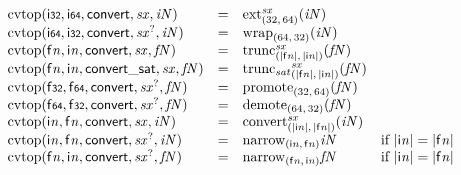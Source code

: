 $$
\begin{array}{@{}lcl@{}l@{}}
{\mathrm{cvtop}}(\mathsf{i{\scriptstyle32}}, \mathsf{i{\scriptstyle64}}, \mathsf{convert}, {\mathit{sx}}, {\mathit{iN}}) &=& {{{{\mathrm{ext}}}_{(32,\, 64)}^{{\mathit{sx}}}}}{({\mathit{iN}})} &  \\
{\mathrm{cvtop}}(\mathsf{i{\scriptstyle64}}, \mathsf{i{\scriptstyle32}}, \mathsf{convert}, {{\mathit{sx}}^?}, {\mathit{iN}}) &=& {{{\mathrm{wrap}}}_{(64,\, 32)}}{({\mathit{iN}})} &  \\
{\mathrm{cvtop}}({\mathsf{f}}{{\mathit{n}}}, {\mathsf{i}}{{\mathit{n}}}, \mathsf{convert}, {\mathit{sx}}, {\mathit{fN}}) &=& {{{{\mathrm{trunc}}}_{({|{\mathsf{f}}{{\mathit{n}}}|},\, {|{\mathsf{i}}{{\mathit{n}}}|})}^{{\mathit{sx}}}}}{({\mathit{fN}})} &  \\
{\mathrm{cvtop}}({\mathsf{f}}{{\mathit{n}}}, {\mathsf{i}}{{\mathit{n}}}, \mathsf{convert\_sat}, {\mathit{sx}}, {\mathit{fN}}) &=& {{{{\mathrm{trunc}}_{{\mathit{sat}}}}_{({|{\mathsf{f}}{{\mathit{n}}}|},\, {|{\mathsf{i}}{{\mathit{n}}}|})}^{{\mathit{sx}}}}}{({\mathit{fN}})} &  \\
{\mathrm{cvtop}}(\mathsf{f{\scriptstyle32}}, \mathsf{f{\scriptstyle64}}, \mathsf{convert}, {{\mathit{sx}}^?}, {\mathit{fN}}) &=& {{{\mathrm{promote}}}_{(32,\, 64)}}{({\mathit{fN}})} &  \\
{\mathrm{cvtop}}(\mathsf{f{\scriptstyle64}}, \mathsf{f{\scriptstyle32}}, \mathsf{convert}, {{\mathit{sx}}^?}, {\mathit{fN}}) &=& {{{\mathrm{demote}}}_{(64,\, 32)}}{({\mathit{fN}})} &  \\
{\mathrm{cvtop}}({\mathsf{i}}{{\mathit{n}}}, {\mathsf{f}}{{\mathit{n}}}, \mathsf{convert}, {\mathit{sx}}, {\mathit{iN}}) &=& {{{{\mathrm{convert}}}_{({|{\mathsf{i}}{{\mathit{n}}}|},\, {|{\mathsf{f}}{{\mathit{n}}}|})}^{{\mathit{sx}}}}}{({\mathit{iN}})} &  \\
{\mathrm{cvtop}}({\mathsf{i}}{{\mathit{n}}}, {\mathsf{f}}{{\mathit{n}}}, \mathsf{convert}, {{\mathit{sx}}^?}, {\mathit{iN}}) &=& {{{\mathrm{narrow}}}_{({\mathsf{i}}{{\mathit{n}}},\, {\mathsf{f}}{{\mathit{n}}})}}{{\mathit{iN}}} &\quad
  \mbox{if}~{|{\mathsf{i}}{{\mathit{n}}}|} = {|{\mathsf{f}}{{\mathit{n}}}|} \\
{\mathrm{cvtop}}({\mathsf{f}}{{\mathit{n}}}, {\mathsf{i}}{{\mathit{n}}}, \mathsf{convert}, {{\mathit{sx}}^?}, {\mathit{fN}}) &=& {{{\mathrm{narrow}}}_{({\mathsf{f}}{{\mathit{n}}},\, {\mathsf{i}}{{\mathit{n}}})}}{{\mathit{fN}}} &\quad
  \mbox{if}~{|{\mathsf{i}}{{\mathit{n}}}|} = {|{\mathsf{f}}{{\mathit{n}}}|} \\
\end{array}
$$

